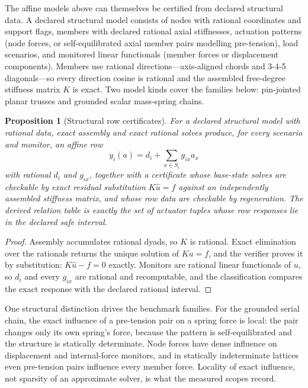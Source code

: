 \documentclass[11pt]{article}
\theoremstyle{plain}
\newtheorem{proposition}[theorem]{Proposition}
\theoremstyle{definition}
\theoremstyle{remark}
\begin{document}
The affine models above can themselves be certified from declared structural
data.  A declared structural model consists of nodes with rational
coordinates and support flags, members with declared rational axial
stiffnesses, actuation patterns (node forces, or self-equilibrated axial
member pairs modelling pre-tension), load scenarios, and monitored linear
functionals (member forces or displacement components).  Members use rational
directions---axis-aligned chords and 3-4-5 diagonals---so every direction
cosine is rational and the assembled free-degree stiffness matrix \(K\) is
exact.  Two model kinds cover the families below: pin-jointed planar trusses
and grounded scalar mass-spring chains.

\begin{proposition}[Structural row certificates]
\label{prop:structural-row-certificates}
For a declared structural model with rational data, exact assembly and exact
rational solves produce, for every scenario and monitor, an affine row
\[
  y_i(a)=d_i+\sum_{x\in S_i}g_{ix}a_x
\]
with rational \(d_i\) and \(g_{ix}\), together with a certificate whose
base-state solves are checkable by exact residual substitution
\(K\widehat u=f\) against an independently assembled stiffness matrix, and
whose row data are checkable by regeneration.  The derived relation table is
exactly the set of actuator tuples whose row responses lie in the declared
safe interval.
\end{proposition}

\begin{proof}
Assembly accumulates rational dyads, so \(K\) is rational.  Exact
elimination over the rationals returns the unique solution of \(Ku=f\), and
the verifier proves it by substitution: \(K\widehat u-f=0\) exactly.
Monitors are rational linear functionals of \(u\), so \(d_i\) and every
\(g_{ix}\) are rational and recomputable, and the classification compares
the exact response with the declared rational interval.
\end{proof}

One structural distinction drives the benchmark families.  For the grounded
serial chain, the exact influence of a pre-tension pair on a spring force is
local: the pair changes only its own spring's force, because the pattern is
self-equilibrated and the structure is statically determinate.  Node forces
have dense influence on displacement and internal-force monitors, and in
statically indeterminate lattices even pre-tension pairs influence every
member force.  Locality of exact influence, not sparsity of an approximate
solver, is what the measured scopes record.
\end{document}
